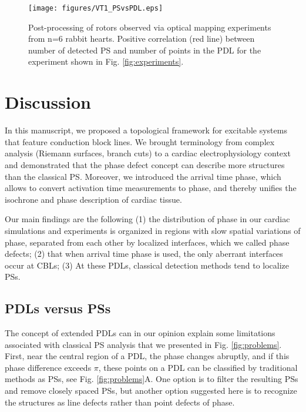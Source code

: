 \documentclass[aps,pre,amsfonts,amssymb,amsmath,twocolumn, superscriptaddress]{revtex4-1}
\begin{document}
\begin{figure*}[htp]
\centering
\texttt{[image: figures/VT1\_PSvsPDL.eps]}
\caption{Post-processing of rotors observed via optical mapping experiments from n=6 rabbit hearts. %
Positive correlation (red line) between number of detected PS and number of points in the PDL for the experiment shown in Fig. \ref{fig:experiments}. \label{fig:post}
}
\end{figure*}

\section{Discussion}\label{sec:discussion}

In this manuscript, we proposed a topological framework for excitable systems that feature conduction block lines. We brought terminology from complex analysis (Riemann surfaces, branch cuts) to a cardiac electrophysiology context and demonstrated that the phase defect concept can describe more structures than the classical PS. Moreover, we introduced the arrival time phase, which allows to convert activation time measurements to phase, and thereby unifies the isochrone and phase description of cardiac tissue. 

Our main findings are the following (1) the distribution of phase in our cardiac simulations and experiments is organized in regions with slow spatial variations of phase, separated from each other by localized interfaces, which we called phase defects; (2) that when arrival time phase is used, the only aberrant interfaces occur at CBLs; (3) At these PDLs, classical detection methods tend to localize PSs. 

\subsection{PDLs versus PSs}

The concept of extended PDLs can in our opinion explain some limitations associated with classical PS analysis that we presented in Fig. \ref{fig:problems}. First, near the central region of a PDL, the phase changes abruptly, and if this phase difference exceeds $\pi$, these points on a PDL can be classified by traditional methods as PSs, see Fig. \ref{fig:problems}A. One option is to filter the resulting PSs and remove closely spaced PSs, but another option suggested here is to recognize the structures as line defects rather than point defects of phase.  
\end{document}
